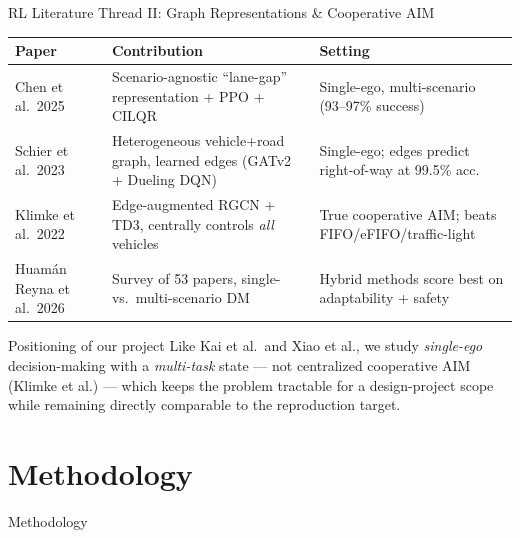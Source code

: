 \documentclass[aspectratio=169,10pt]{beamer}
\begin{document}
\begin{frame}{RL Literature Thread II: Graph Representations \& Cooperative AIM}
    \scriptsize
    \begin{table}
    \begin{tabularx}{\textwidth}{@{}l X X@{}}
        \toprule
        \textbf{Paper} & \textbf{Contribution} & \textbf{Setting} \\
        \midrule
        Chen et al.\ 2025 \cite{chen2025unified} & Scenario-agnostic ``lane-gap'' representation + PPO + CILQR & Single-ego, multi-scenario (93--97\% success) \\
        Schier et al.\ 2023 \cite{schier2023deep} & Heterogeneous vehicle+road graph, learned edges (GATv2 + Dueling DQN) & Single-ego; edges predict right-of-way at 99.5\% acc. \\
        Klimke et al.\ 2022 \cite{klimke2022enhanced} & Edge-augmented RGCN + TD3, centrally controls \emph{all} vehicles & \alert{True cooperative AIM}; beats FIFO/eFIFO/traffic-light \\
        Huamán Reyna et al.\ 2026 \cite{huamanreyna2026review} & Survey of 53 papers, single- vs.\ multi-scenario DM & Hybrid methods score best on adaptability + safety \\
        \bottomrule
    \end{tabularx}
    \end{table}
    \vspace{6pt}
    \begin{block}{Positioning of our project}
        Like Kai et al.\ and Xiao et al., we study \emph{single-ego} decision-making with a \emph{multi-task} state --- not centralized cooperative AIM (Klimke et al.) --- which keeps the problem tractable for a design-project scope while remaining directly comparable to the reproduction target.
    \end{block}
\end{frame}

\section{Methodology}

\begin{frame}{Methodology}
\end{frame}
\end{document}
